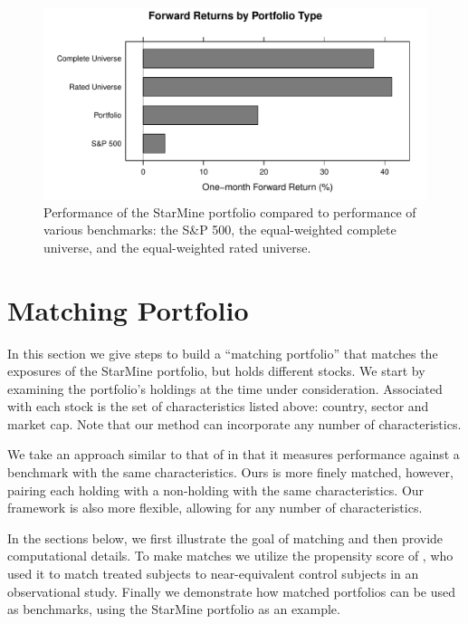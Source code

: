\documentclass{article}\usepackage{graphicx, color}
\makeatletter
\def\maxwidth{ %
  \ifdim\Gin@nat@width>\linewidth
    \linewidth
  \else
    \Gin@nat@width
  \fi
}
\newenvironment{knitrout}{}{} %
\makeatother
\begin{document}
\begin{figure}
\begin{center}
\begin{knitrout}
\color{fgcolor}
\includegraphics[width=\maxwidth]{figure/unnamed-chunk-7} 

\end{knitrout}

\end{center}
\caption{Performance of the StarMine portfolio compared to performance
  of various benchmarks: the S\&P 500, the equal-weighted complete
  universe, and the equal-weighted rated universe.}
\label{FigurePerformance}
\end{figure}

\section{Matching Portfolio}

In this section we give steps to build a ``matching portfolio'' that
matches the exposures of the StarMine portfolio, but holds different
stocks. We start by examining the portfolio's holdings at the time under
consideration. Associated with each stock is the set of characteristics
listed above: country, sector and market cap. Note that our method can
incorporate any number of characteristics.

We take an approach similar to that of \cite{daniel97.1} in that it measures
performance against a benchmark with the same characteristics. Ours is
more finely matched, however, pairing each holding with a
non-holding with the same characteristics. Our framework is also more
flexible, allowing for any number of characteristics.

In the sections below, we first illustrate the goal of matching and
then provide computational details. To make matches we utilize the
propensity score of \cite{rosenbaum83}, who used it to match treated
subjects to near-equivalent control subjects in an observational
study. Finally we demonstrate how matched portfolios can be used as
benchmarks, using the StarMine portfolio as an example.
\end{document}
